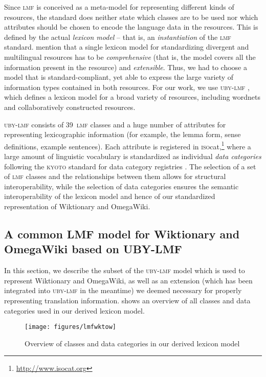 \documentclass[output=paper]{LSP/langsci}
\begin{document}
Since \textsc{lmf} is conceived as a meta-model for representing different kinds of resources, the standard does neither state which classes are to be used nor which attributes should be chosen to encode the language data in the resources. This is defined by the actual \emph{lexicon model} -- that is, an \emph{instantiation} of the \textsc{lmf} standard. \citet{EckleKohler12} mention that a single lexicon model for standardizing divergent and  multilingual resources has to be \emph{comprehensive} (that is, the model covers all the information present in the resource) and \emph{extensible}.
Thus, we had to choose a model that is standard-compliant, yet able to express the large variety of information types contained in both resources. For our work, we use \textsc{uby-lmf} \citep{EckleKohler12}, which defines a lexicon model for a broad variety of resources, including wordnets and collaboratively constructed resources. 

\textsc{uby-lmf} consists of 39~\textsc{lmf} classes and a huge number of attributes for representing lexicographic information (for example, the lemma form, sense definitions, example sentences). Each attribute is registered in \textsc{iso}cat,\footnote{\url{http://www.isocat.org}} where a large amount of linguistic vocabulary is standardized as individual \emph{data categories} following the \textsc{kyoto} standard for data category registries \citep{iso12620}. The selection of a set of \textsc{lmf} classes and the relationships between them allows for structural interoperability, while the selection of data categories ensures the semantic interoperability of the lexicon model and hence of our standardized representation of Wiktionary and OmegaWiki.

\subsection{A common LMF model for Wiktionary and OmegaWiki based on UBY-LMF}
\label{sec:matuschek:lmf:overview}
In this section, we describe the subset of the \textsc{uby-lmf} model which is used to represent Wiktionary and OmegaWiki, as well as an extension (which has been integrated into \textsc{uby-lmf} in the meantime) we deemed necessary for properly representing translation information.  shows an overview of all classes and data categories used in our derived lexicon model.

\begin{figure}
  \texttt{[image: figures/lmfwktow]}
  \caption{Overview of classes and data categories in our derived lexicon model}
  \label{fig:lmf}
\end{figure}
\end{document}
